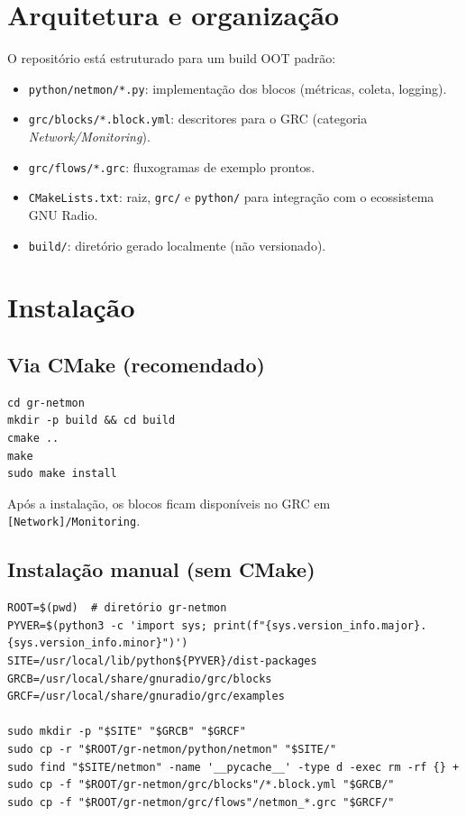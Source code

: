 \documentclass[11pt,a4paper]{article}
\begin{document}
\section{Arquitetura e organização}
O repositório está estruturado para um build OOT padrão:
\begin{itemize}[leftmargin=1.5em]
  \item \texttt{python/netmon/*.py}: implementação dos blocos (métricas, coleta, logging).
  \item \texttt{grc/blocks/*.block.yml}: descritores para o GRC (categoria \textit{Network/Monitoring}).
  \item \texttt{grc/flows/*.grc}: fluxogramas de exemplo prontos.
  \item \texttt{CMakeLists.txt}: raiz, \texttt{grc/} e \texttt{python/} para integração com o ecossistema GNU Radio.
  \item \texttt{build/}: diretório gerado localmente (não versionado).
\end{itemize}

\section{Instalação}
\subsection{Via CMake (recomendado)}
\begin{verbatim}
cd gr-netmon
mkdir -p build && cd build
cmake ..
make
sudo make install
\end{verbatim}
Após a instalação, os blocos ficam disponíveis no GRC em \texttt{[Network]/Monitoring}.

\subsection{Instalação manual (sem CMake)}
\begin{verbatim}
ROOT=$(pwd)  # diretório gr-netmon
PYVER=$(python3 -c 'import sys; print(f"{sys.version_info.major}.{sys.version_info.minor}")')
SITE=/usr/local/lib/python${PYVER}/dist-packages
GRCB=/usr/local/share/gnuradio/grc/blocks
GRCF=/usr/local/share/gnuradio/grc/examples

sudo mkdir -p "$SITE" "$GRCB" "$GRCF"
sudo cp -r "$ROOT/gr-netmon/python/netmon" "$SITE/"
sudo find "$SITE/netmon" -name '__pycache__' -type d -exec rm -rf {} +
sudo cp -f "$ROOT/gr-netmon/grc/blocks"/*.block.yml "$GRCB/"
sudo cp -f "$ROOT/gr-netmon/grc/flows"/netmon_*.grc "$GRCF/"
\end{verbatim}
\end{document}
